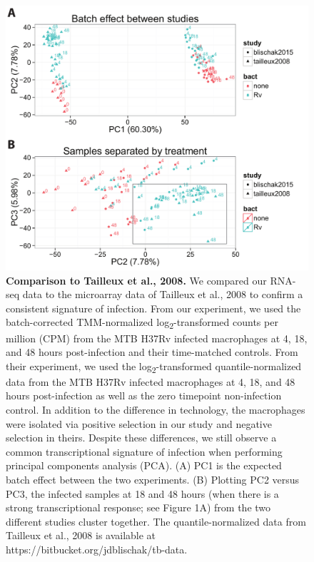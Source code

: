 \begin{figure}[htbp]
\centering
\includegraphics[width=5in]{img/ch02/fig-S10-tailleux2008.pdf}
\caption[Comparison to Tailleux et al., 2008.]{\textbf{Comparison to
    Tailleux et al., 2008.} We compared our RNA-seq data to the
  microarray data of Tailleux et al., 2008 \citep{Tailleux2008} to
  confirm a consistent signature of infection.  From our experiment,
  we used the batch-corrected TMM-normalized
  log\textsubscript{2}-transformed counts per million (CPM) from the
  MTB H37Rv infected macrophages at 4, 18, and 48 hours post-infection
  and their time-matched controls. From their experiment, we used the
  log\textsubscript{2}-transformed quantile-normalized data from the
  MTB H37Rv infected macrophages at 4, 18, and 48 hours post-infection
  as well as the zero timepoint non-infection control. In addition to
  the difference in technology, the macrophages were isolated via
  positive selection in our study and negative selection in
  theirs. Despite these differences, we still observe a common
  transcriptional signature of infection when performing principal
  components analysis (PCA). (A) PC1 is the expected batch effect
  between the two experiments. (B) Plotting PC2 versus PC3, the
  infected samples at 18 and 48 hours (when there is a strong
  transcriptional response; see Figure 1A) from the two different
  studies cluster together. The quantile-normalized data from Tailleux
  et al., 2008 \citep{Tailleux2008} is available at
  https://bitbucket.org/jdblischak/tb-data.}
\label{fig:tailleux2008}
\end{figure}
